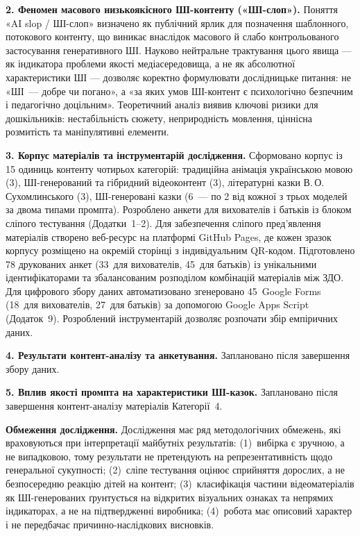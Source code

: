 \documentclass[14pt, a4paper]{extreport}
\begin{document}
\textbf{2. Феномен масового низькоякісного ШІ-контенту («ШІ-слоп»).}
Поняття «AI slop / ШІ-слоп» визначено як публічний ярлик для позначення шаблонного, потокового контенту, що виникає внаслідок масового й слабо контрольованого застосування генеративного ШІ. Науково нейтральне трактування цього явища --- як індикатора проблеми якості медіасередовища, а не як абсолютної характеристики ШІ --- дозволяє коректно формулювати дослідницьке питання: не «ШІ~--- добре чи погано», а «за яких умов ШІ-контент є психологічно безпечним і педагогічно доцільним». Теоретичний аналіз виявив ключові ризики для дошкільників: нестабільність сюжету, неприродність мовлення, ціннісна розмитість та маніпулятивні елементи.

\textbf{3. Корпус матеріалів та інструментарій дослідження.}
Сформовано корпус із 15 одиниць контенту чотирьох категорій: традиційна анімація українською мовою (3), ШІ-генерований та гібридний відеоконтент (3), літературні казки В.\,О.\,Сухомлинського (3), ШІ-генеровані казки (6~--- по 2 від кожної з трьох моделей за двома типами промпта). Розроблено анкети для вихователів і батьків із блоком сліпого тестування (Додатки~1--2). Для забезпечення сліпого пред'явлення матеріалів створено веб-ресурс на платформі GitHub Pages, де кожен зразок корпусу розміщено на окремій сторінці з індивідуальним QR-кодом. Підготовлено 78 друкованих анкет (33~для вихователів, 45~для батьків) із унікальними ідентифікаторами та збалансованим розподілом комбінацій матеріалів між ЗДО. Для цифрового збору даних автоматизовано згенеровано 45~Google Forms (18~для вихователів, 27~для батьків) за допомогою Google Apps Script (Додаток~9). Розроблений інструментарій дозволяє розпочати збір емпіричних даних.

\textbf{4. Результати контент-аналізу та анкетування.}
Заплановано після завершення збору даних.

\textbf{5. Вплив якості промпта на характеристики ШІ-казок.}
Заплановано після завершення контент-аналізу матеріалів Категорії~4.

\textbf{Обмеження дослідження.}
Дослідження має ряд методологічних обмежень, які враховуються при інтерпретації майбутніх результатів: (1)~вибірка є зручною, а не випадковою, тому результати не претендують на репрезентативність щодо генеральної сукупності; (2)~сліпе тестування оцінює сприйняття дорослих, а не безпосередню реакцію дітей на контент; (3)~класифікація частини відеоматеріалів як ШІ-генерованих ґрунтується на відкритих візуальних ознаках та непрямих індикаторах, а не на підтвердженні виробника; (4)~робота має описовий характер і не передбачає причинно-наслідкових висновків.
\end{document}

